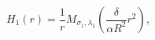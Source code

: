 \begin{equation}
H_{1}(r)=\frac{1}{r}M_{\sigma_{1}, \lambda_{1}}\left( \frac{\delta}{\alpha R^2} 
r^2\right),
\label{15}
\end{equation}

